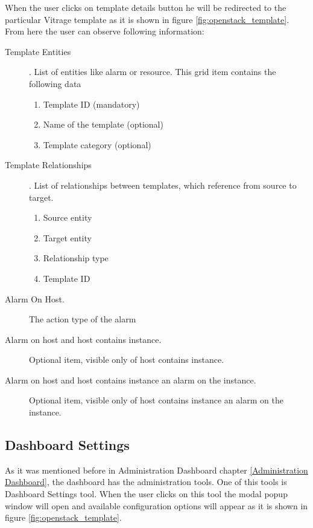 When the user clicks on template details button he will be redirected to the particular Vitrage template as it is shown in figure \ref{fig:openstack_template}. From here the user can observe following information:
\begin{description}
\item[Template Entities]. List of entities like alarm or resource. This grid item contains the following data
\begin{enumerate}
\item Template ID (mandatory)
\item Name of the template (optional)
\item Template category (optional)
\end{enumerate}
\item[Template Relationships]. List of relationships between templates, which reference from source to target.
\begin{enumerate}
\item Source entity
\item Target entity
\item Relationship type
\item Template ID
\end{enumerate}
\item[Alarm On Host.] The action type of the alarm
\item[Alarm on host and host contains instance.] Optional item, visible only of host contains instance.
\item[Alarm on host and host contains instance an alarm on the instance.] Optional item, visible only of host contains instance an alarm on the instance.

\end{description}





\subsection{Dashboard Settings}\label{Dashboard Settings}
As it was mentioned before in Administration Dashboard chapter \autoref{Administration Dashboard}, the dashboard has the administration tools. One of this tools is Dashboard Settings tool. When the user clicks on this tool the modal popup window will open and available configuration options will appear as it is shown in figure \ref{fig:openstack_template}.

